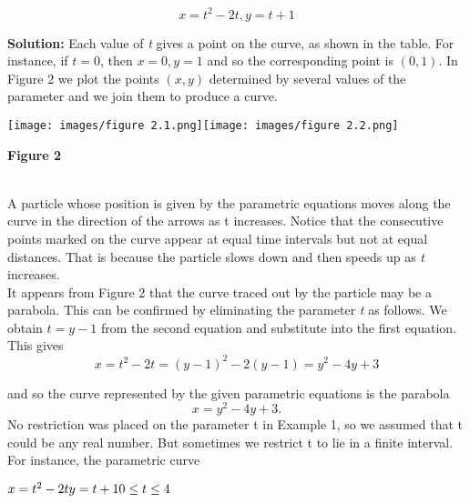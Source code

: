 \documentclass{article}
\begin{document}
\begin{center}
    \begin{equation*}
        x = t^2 -2t, y = t + 1
    \end{equation*}
\end{center}

\textbf{Solution:} Each value of \textsl{t} gives a point on the curve, as shown in the table. For instance, if \begin{math} t = 0 \end{math}, then \begin{math} x = 0, y =1 \end{math} and so the corresponding point is \begin{math} (0, 1) \end{math}. In Figure 2 we plot the points \begin{math} (x, y) \end{math} determined by several values of the parameter and we join them to produce a curve.


\begin{center}
\texttt{[image: images/figure 2.1.png]}\quad\texttt{[image: images/figure 2.2.png]}
\end{center}

\begin{center}
\textbf{Figure 2}
\end{center}\\


A particle whose position is given by the parametric equations moves along the curve in the direction of the arrows as t increases. Notice that the consecutive points marked on the curve appear at equal time intervals but not at equal distances. That is because the particle slows down and then speeds up as \textsl{t} increases.\\
\indent\setlength{\parindent}{1em} It appears from Figure 2 that the curve traced out by the particle may be a parabola. This can be confirmed by eliminating the parameter \textsl{t} as follows. We obtain \begin{math} t = y - 1 \end{math} from the second equation and substitute into the first equation. This gives
\begin{equation}
    x = t^2 - 2t = (y - 1)^2 - 2(y - 1) = y^2 -4y + 3
\end{equation}

and so the curve represented by the given parametric equations is the parabola
\begin{equation*} x = y^ 2 - 4y + 3.\end{equation*}
\indent\setlength{\parindent}{1em} No restriction was placed on the parameter t in Example 1, so we assumed that t could be any real number. But sometimes we restrict t to lie in a finite interval. For instance, the parametric curve\\
\begin{center}
\begin{math}
    x = t^2 - 2t \\ 
    y = t + 1\\
    0 \leq t \leq 4
\end{math}
\end{center}
\end{document}
